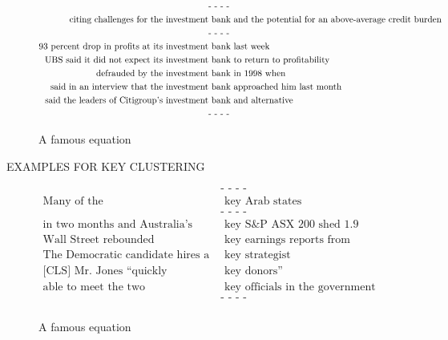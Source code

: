 \documentclass[a4paper,12pt,twoside,openright]{report}
\begin{document}
\begin{figure}[H]
\begin{align}
\text{                                              } & \text{- - - -} \nonumber \\
\text{citing challenges for the investment} & \text{ bank and the potential for an above-average credit burden} \nonumber \\
\text{                                              } & \text{- - - -} \nonumber \\
\text{93 percent drop in profits at its investment} & \text{ bank last week} \nonumber \\
\text{UBS said it did not expect its investment} & \text{ bank to return to profitability} \nonumber \\
\text{defrauded by the investment} & \text{ bank in 1998 when} \nonumber \\
\text{said in an interview that the investment} & \text{ bank approached him last month \nonumber} \\
\text{said the leaders of Citigroup’s investment} & \text{ bank and alternative} \nonumber \\
\text{                                            } & \text{- - - -} \nonumber \\
\end{align}
\caption{A famous equation}
\end{figure}

EXAMPLES FOR KEY CLUSTERING

\begin{figure}[H]
\begin{align}
\text{                                                 } & \text{- - - -} \nonumber \\
\text{Many of the} & \text{ key Arab states } \nonumber \\
\text{                                                 } & \text{- - - -} \nonumber \\
\text{in two months and Australia's} & \text{ key S\&P ASX 200 shed 1.9 percent } \nonumber \\
\text{Wall Street rebounded Wednesday after} & \text{ key earnings reports from JPMorgan Chase \& Co.} \nonumber \\
\text{The Democratic candidate hires a} & \text{ key strategist} \nonumber \\
\text{[CLS] Mr. Jones “quickly established a good rapport with} & \text{ key donors” } \nonumber \\
\text{able to meet the two} & \text{ key officials in the government} \nonumber \\
\text{                                                 } & \text{- - - -} \nonumber \\
\end{align}
\caption{A famous equation}
\end{figure}
\end{document}
